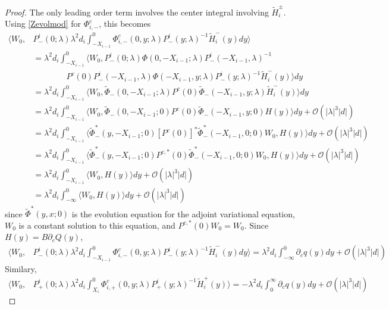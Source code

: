 \documentclass[thesis.tex]{subfiles}
\begin{document}
\begin{lemma}
\begin{proof}
The only leading order term involves the center integral involving $\tilde{H}_i^\pm$. Using \cref{Zevolmod} for $\Phi^c_{i,-}$, this becomes
\begin{align*}
\langle W_0, &P^i_-(0; \lambda) \lambda^2 d_i \int_{-X_{i-1}}^0 \Phi^c_{i,-}(0, y; \lambda) P^i_-(y; \lambda)^{-1} \tilde{H}_i^-(y) dy \rangle \\
&= \lambda^2 d_i \int_{-X_{i-1}}^0 \langle W_0, P^i_-(0; \lambda) \Phi(0, -X_{i-1}; \lambda) P^i_-(-X_{i-1}, \lambda)^{-1} \\
&\qquad \qquad
P^c(0) P^i_-(-X_{i-1}, \lambda) \Phi(-X_{i-1}, y; \lambda) P^i_-(y; \lambda)^{-1} \tilde{H}_i^-(y) \rangle dy \\
&= \lambda^2 d_i \int_{-X_{i-1}}^0 \langle W_0, \tilde{\Phi}_-(0, -X_{i-1}; \lambda) 
P^c(0) \tilde{\Phi}_-(-X_{i-1}, y; \lambda) \tilde{H}_i^-(y) \rangle dy \\ 
&= \lambda^2 d_i \int_{-X_{i-1}}^0 \langle W_0, \tilde{\Phi}_-(0, -X_{i-1}; 0) 
P^c(0) \tilde{\Phi}_-(-X_{i-1}, y; 0) H(y) \rangle dy + \mathcal{O}(|\lambda|^3 |d|) \\
&= \lambda^2 d_i \int_{-X_{i-1}}^0 \langle \tilde{\Phi}^*_-(y, -X_{i-1}; 0) [P^c(0)]^* \tilde{\Phi}^*_-(-X_{i-1}, 0; 0) W_0,
 H(y) \rangle dy + \mathcal{O}(|\lambda|^3 |d|) \\
&= \lambda^2 d_i \int_{-X_{i-1}}^0 \langle \tilde{\Phi}^*_-(y, -X_{i-1}; 0) P^{c,*}(0) \tilde{\Phi}^*_-(-X_{i-1}, 0; 0) W_0,
 H(y) \rangle dy + \mathcal{O}(|\lambda|^3 |d|) \\
&= \lambda^2 d_i \int_{-X_{i-1}}^0 \langle W_0, H(y) \rangle dy + \mathcal{O}(|\lambda|^3 |d|) \\
&= \lambda^2 d_i \int_{-\infty}^0 \langle W_0, H(y) \rangle dy + \mathcal{O}(|\lambda|^3 |d|)
\end{align*}
since $\tilde{\Phi}^*(y, x; 0)$ is the evolution equation for the adjoint variational equation, $W_0$ is a constant solution to this equation, and $P^{c,*}(0) W_0 = W_0$. Since $H(y) = B \partial_c Q(y)$,
\begin{align*}
\langle W_0, &P^i_-(0; \lambda) \lambda^2 d_i \int_{-X_{i-1}}^0 \Phi^c_{i,-}(0, y; \lambda) P^i_-(y; \lambda)^{-1} \tilde{H}_i^-(y) dy \rangle 
= \lambda^2 d_i \int_{-\infty}^0 \partial_c q(y)dy + \mathcal{O}(|\lambda|^3 |d|)
\end{align*}
Similary, 
\begin{align*}
\langle W_0, &P^i_+(0; \lambda) \lambda^2 d_i \int_{X_i}^0 \Phi^c_{i,+}(0, y; \lambda) P^i_+(y; \lambda)^{-1}   \tilde{H}_i^+(y) \rangle 
= -\lambda^2 d_i \int_0^{\infty} \partial_c q(y)dy + \mathcal{O}(|\lambda|^3 |d|)
\end{align*}


\end{proof}
\end{lemma}
\end{document}
